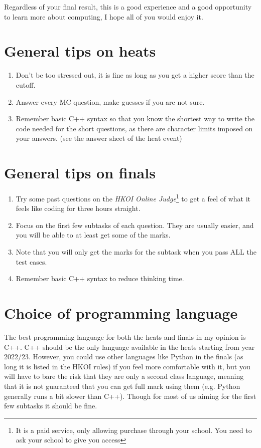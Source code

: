 Regardless of your final result, this is a good experience and a good opportunity to learn more about computing, I hope all of you would enjoy it.

\section{General tips on heats}
\begin{enumerate}
    \item Don't be too stressed out, it is fine as long as you get a higher score than the cutoff.
    \item Answer every MC question, make guesses if you are not sure.
    \item Remember basic C++ syntax so that you know the shortest way to write the code needed for the short questions, as there are character limits imposed on your answers. (see the answer sheet of the heat event)
\end{enumerate}

\section{General tips on finals}
\begin{enumerate}
    \item Try some past questions on the \textit{HKOI Online Judge}\footnote{It is a paid service, only allowing purchase through your school. You need to ask your school to give you access} to get a feel of what it feels like coding for three hours straight.
    \item Focus on the first few subtasks of each question. They are usually easier, and you will be able to at least get some of the marks.
    \item Note that you will only get the marks for the subtask when you pass ALL the test cases.
    \item Remember basic C++ syntax to reduce thinking time.
\end{enumerate}

\section{Choice of programming language}

The best programming language for both the heats and finals in my opinion is C++. C++ should be the only language available in the heats starting from year 2022/23. However, you could use other languages like Python in the finals (as long it is listed in the HKOI rules) if you feel more comfortable with it, but you will have to bare the risk that they are only a second class language, meaning that it is not guaranteed that you can get full mark using them (e.g. Python generally runs a bit slower than C++). Though for most of us aiming for the first few subtasks it should be fine.